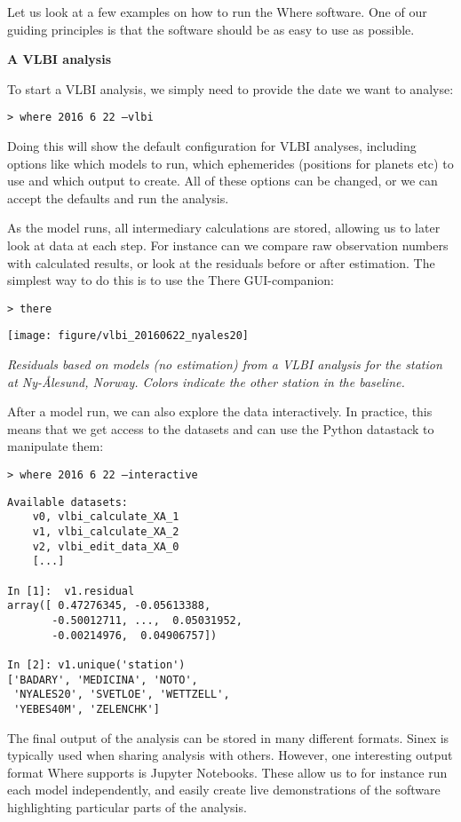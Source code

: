 Let us look at a few examples on how to run the Where software. One of our
guiding principles is that the software should be as easy to use as possible.

{\bfseries A VLBI analysis}

To start a VLBI analysis, we simply need to provide the date we want to analyse:

\texttt{> where 2016 6 22 --vlbi}

Doing this will show the default configuration for VLBI analyses, including
options like which models to run, which ephemerides (positions for planets etc)
to use and which output to create. All of these options can be changed, or we
can accept the defaults and run the analysis.

As the model runs, all intermediary calculations are stored, allowing us to
later look at data at each step. For instance can we compare raw observation
numbers with calculated results, or look at the residuals before or after
estimation. The simplest way to do this is to use the There GUI-companion:

\texttt{> there}

\texttt{[image: figure/vlbi\_20160622\_nyales20]}

{\itshape Residuals based on models (no estimation) from a VLBI analysis for the
  station at Ny-{\AA}lesund, Norway. Colors indicate the other station in the
  baseline.}

After a model run, we can also explore the data interactively. In practice, this
means that we get access to the datasets and can use the Python datastack to
manipulate them:

\texttt{> where 2016 6 22 --interactive}

\begin{verbatim}
Available datasets:
    v0, vlbi_calculate_XA_1
    v1, vlbi_calculate_XA_2
    v2, vlbi_edit_data_XA_0
    [...]

In [1]:  v1.residual
array([ 0.47276345, -0.05613388,
       -0.50012711, ...,  0.05031952,
       -0.00214976,  0.04906757])

In [2]: v1.unique('station')
['BADARY', 'MEDICINA', 'NOTO',
 'NYALES20', 'SVETLOE', 'WETTZELL',
 'YEBES40M', 'ZELENCHK']
\end{verbatim}

The final output of the analysis can be stored in many different formats. Sinex
is typically used when sharing analysis with others. However, one interesting
output format Where supports is Jupyter Notebooks. These allow us to for
instance run each model independently, and easily create live demonstrations of
the software highlighting particular parts of the analysis.

